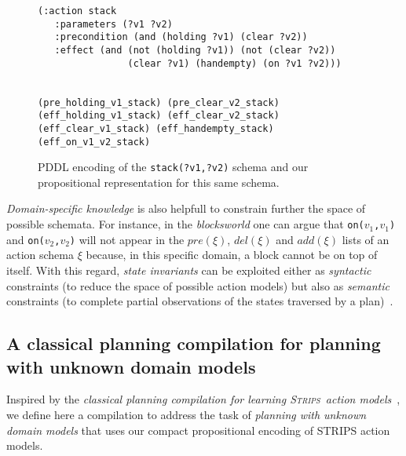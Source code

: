 \documentclass{article}
\newcommand{\strips}{\textsc{Strips}}
\begin{document}
\begin{figure}
  \begin{tiny}  
  \begin{verbatim}
(:action stack
   :parameters (?v1 ?v2)
   :precondition (and (holding ?v1) (clear ?v2))
   :effect (and (not (holding ?v1)) (not (clear ?v2))
                (clear ?v1) (handempty) (on ?v1 ?v2)))


(pre_holding_v1_stack) (pre_clear_v2_stack)
(eff_holding_v1_stack) (eff_clear_v2_stack)
(eff_clear_v1_stack) (eff_handempty_stack) (eff_on_v1_v2_stack)
  \end{verbatim}           
  \end{tiny}  
 \caption{\small PDDL encoding of the {\tt\small stack(?v1,?v2)} schema and our propositional representation for this same schema.}
\label{fig:propositional}
\end{figure}

{\em Domain-specific knowledge} is also helpfull to constrain further the space of possible schemata. For instance, in the {\em blocksworld} one can argue that {\small\tt on($v_1$,$v_1$)} and {\small\tt on($v_2$,$v_2$)} will not appear in the $pre(\xi)$, $del(\xi)$ and $add(\xi)$ lists of an action schema $\xi$ because, in this specific domain, a block cannot be on top of itself. With this regard, {\it state invariants} can be exploited either as {\em syntactic} constraints (to reduce the space of possible action models) but also as {\em semantic} constraints (to complete partial observations of the states traversed by a plan)~\cite{fox:TIM:JAIR1998}. 

\subsection{A classical planning compilation for planning with unknown domain models}
Inspired by the {\em classical planning compilation for learning \strips\ action models}~\cite{aineto2018learning}, we define here a compilation to address the task of {\em planning with unknown domain models} that uses our compact propositional encoding of STRIPS action models.
\end{document}
